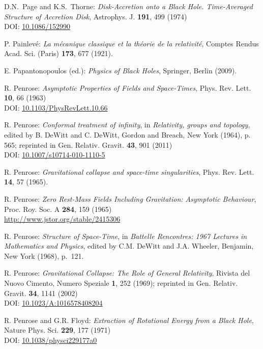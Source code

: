 \begin{thebibliography}{123}
D.N.~Page and K.S.~Thorne: \emph{Disk-Accretion onto a Black Hole. Time-Averaged Structure of Accretion Disk},
Astrophys. J. {\bf 191}, 499 (1974)\\
DOI: \href{https://doi.org/10.1086/152990}{10.1086/152990}

P. Painlevé: \emph{La mécanique classique et la théorie de la relativité},
Comptes Rendus Acad. Sci. (Paris) {\bf 173}, 677 (1921).

E. Papantonopoulos (ed.): {\em Physics of Black Holes}, Springer, Berlin (2009).

R. Penrose: {\em Asymptotic Properties of Fields and Space-Times},
Phys. Rev. Lett. {\bf 10}, 66 (1963)\\
DOI: \href{https://doi.org/10.1103/PhysRevLett.10.66}{10.1103/PhysRevLett.10.66}

R. Penrose: {\em Conformal treatment of infinity}, in {\em Relativity, groups and topology},
edited by B. DeWitt and C. DeWitt,
Gordon and Breach, New York (1964), p. 565; reprinted in
Gen. Relativ. Gravit. {\bf 43}, 901 (2011)\\
DOI: \href{https://doi.org/10.1007/s10714-010-1110-5}{10.1007/s10714-010-1110-5}

R. Penrose: {\em Gravitational collapse and space-time singularities},
Phys. Rev. Lett. {\bf 14}, 57 (1965).

R. Penrose:
{\em Zero Rest-Mass Fields Including Gravitation: Asymptotic Behaviour},
Proc. Roy. Soc. A {\bf 284}, 159 (1965)\\
\url{http://www.jstor.org/stable/2415306}

R. Penrose: {\em Structure of Space-Time},
in {\em Battelle Rencontres: 1967 Lectures in Mathematics and Physics},
edited by C.M. DeWitt and J.A. Wheeler,
Benjamin, New York (1968), p.~121.

R. Penrose: {\em Gravitational Collapse: The Role of General Relativity},
Rivista del Nuovo Cimento, Numero Speziale {\bf 1}, 252 (1969); reprinted in
Gen. Relativ. Gravit. {\bf 34}, 1141 (2002)\\
DOI: \href{https://doi.org/10.1023/A:1016578408204}{10.1023/A:1016578408204}

R. Penrose and G.R. Floyd: {\em Extraction of Rotational Energy from
a Black Hole},  Nature Phys. Sci. {\bf 229}, 177 (1971)\\
DOI: \href{https://doi.org/10.1038/physci229177a0}{10.1038/physci229177a0}


\end{thebibliography}
